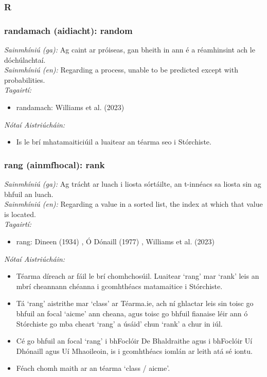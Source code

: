  \subsubsection*{R}

\subsubsection*{randamach (aidiacht): random}
 \noindent \textit{Sainmhíniú (ga):} Ag caint ar próiseas, gan bheith in ann é a réamhinsint ach le dóchúlachtaí.
\\
 \noindent \textit{Sainmhíniú (en):} Regarding a process, unable to be predicted except with probabilities.
\\
 \noindent \textit{Tagairtí:}
\begin{itemize}
	\item randamach: Williams et al. (2023) \cite{storchiste}
\end{itemize}

 \noindent \textit{Nótaí Aistriúcháin:}
\begin{itemize}
	\item Is le brí mhatamaiticiúil a luaitear an téarma seo i Stórchiste.
\end{itemize}


\subsubsection*{rang (ainmfhocal): rank}
 \noindent \textit{Sainmhíniú (ga):} Ag trácht ar luach i liosta sórtáilte, an t-innéacs sa liosta sin ag bhfuil an luach.
\\
 \noindent \textit{Sainmhíniú (en):} Regarding a value in a sorted list, the index at which that value is located.
\\
 \noindent \textit{Tagairtí:}
\begin{itemize}
	\item rang: Dineen (1934) \cite{dineen}, Ó Dónaill (1977) \cite{odonaill}, Williams et al. (2023) \cite{storchiste}
\end{itemize}

 \noindent \textit{Nótaí Aistriúcháin:}
\begin{itemize}
	\item Téarma díreach ar fáil le brí chomhchosúil. Luaitear `rang' mar `rank' leis an mbrí cheannann chéanna i gcomhthéacs matamaitice i Stórchiste.
	\item Tá `rang' aistrithe mar `class' ar Téarma.ie, ach ní ghlactar leis sin toisc go bhfuil an focal `aicme' ann cheana, agus toisc go bhfuil fianaise léir ann ó Stórchiste go mba cheart `rang' a úsáid' chun `rank' a chur in iúl.
	\item Cé go bhfuil an focal `rang' i bhFoclóir De Bhaldraithe agus i bhFoclóir Uí Dhónaill agus Uí Mhaoileoin, is i gcomhthéacs iomlán ar leith atá sé iontu.
	\item Féach chomh maith ar an téarma `class / aicme'.
\end{itemize}


